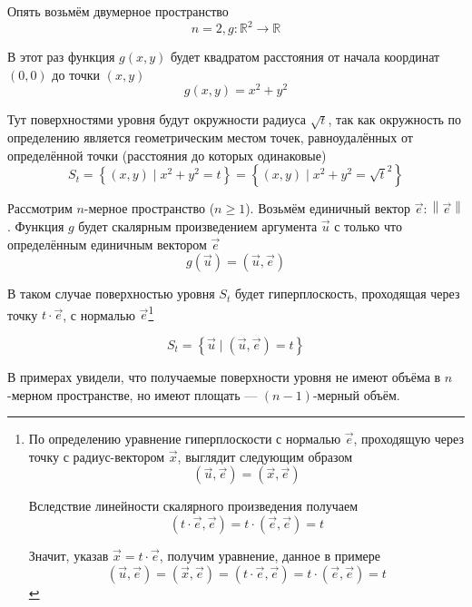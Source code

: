 \begin{example}
    Опять возьмём двумерное пространство
    $$n=2, g: \mathbb{R}^2 \rightarrow \mathbb{R}$$

    В этот раз функция $g\left( x, y \right)$ будет квадратом расстояния
    от начала координат $\left( 0, 0 \right)$ до точки $\left( x, y \right)$
    $$g\left( x, y \right) = x^2 + y^2$$

    Тут поверхностями уровня будут окружности радиуса $\sqrt{t}$,
    так как окружность по определению является геометрическим местом точек,
    равноудалённых от определённой точки (расстояния до которых одинаковые)
    $$S_t
        = \left\{ \left( x, y \right) \mid x^2 + y^2 = t \right\}
        = \left\{ \left( x, y \right) \mid x^2 + y^2 = \sqrt{t}^2 \right\}$$
\end{example}

\begin{example}
    Рассмотрим $n$-мерное пространство ($n \ge 1$).
    Возьмём единичный вектор $\vec{e}: \left\| \vec{e} \right\|$.
    Функция $g$ будет скалярным произведением аргумента $\vec{u}$
    с только что определённым единичным вектором $\vec{e}$
        $$g\left( \vec{u} \right) = \left( \vec{u}, \vec{e} \right)$$

    В таком случае поверхностью уровня $S_t$ будет гиперплоскость,
    проходящая через точку $t \cdot \vec{e}$, с нормалью $\vec{e}$\footnote{
        По определению уравнение гиперплоскости с нормалью $\vec{e}$,
        проходящую через точку с радиус-вектором $\vec{x}$,
        выглядит следующим образом
        $$\left( \vec{u}, \vec{e} \right) = \left( \vec{x}, \vec{e} \right)$$

        Вследствие линейности скалярного произведения получаем
        $$\left( t \cdot \vec{e}, \vec{e} \right)
            = t \cdot \left( \vec{e}, \vec{e} \right) = t$$

        Значит, указав $\vec{x} = t \cdot \vec{e}$, получим уравнение,
        данное в примере
        $$\left( \vec{u}, \vec{e} \right)
            = \left( \vec{x}, \vec{e} \right)
            = \left( t \cdot \vec{e}, \vec{e} \right)
            = t \cdot \left( \vec{e}, \vec{e} \right) = t$$}

    $$S_t = \left\{ \vec{u} \mid \left( \vec{u}, \vec{e} \right) = t \right\}$$

    \end{example}

В примерах увидели, что получаемые поверхности уровня не имеют объёма
в $n$-мерном пространстве, но имеют площать --- $(n-1)$-мерный объём.

